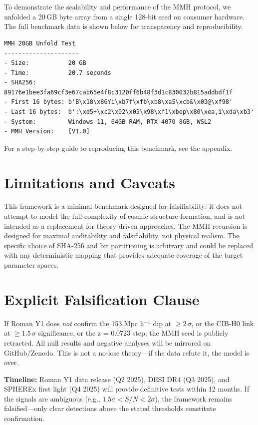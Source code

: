 \documentclass[11pt,a4paper]{article}
\begin{document}
To demonstrate the scalability and performance of the MMH protocol, we unfolded a 20\,GB byte array from a single 128-bit seed on consumer hardware. The full benchmark data is shown below for transparency and reproducibility.

\begin{verbatim}
MMH 20GB Unfold Test
---------------------
- Size:           20 GB
- Time:           20.7 seconds
- SHA256:         89176e1bee3fa69cf3e67cab65e4f8c3120ff6b48f3d1c830032b815addbdf1f
- First 16 bytes: b'B\x18\x86Yi\xb7f\xfb\xb8\xa5\xcb&\x03@\xf98'
- Last 16 bytes:  b':\xd5+\xc2\x02\x05\x98\xf1\xbep\x80\xea,i\xda\xb3'
- System:         Windows 11, 64GB RAM, RTX 4070 8GB, WSL2
- MMH Version:    [V1.0]
\end{verbatim}

For a step-by-step guide to reproducing this benchmark, see the appendix.

\FloatBarrier
\section{Limitations and Caveats}
This framework is a minimal benchmark designed for falsifiability: it does not attempt to model the full complexity of cosmic structure formation, and is not intended as a replacement for theory-driven approaches. The MMH recursion is designed for maximal auditability and falsifiability, not physical realism. The specific choice of SHA-256 and bit partitioning is arbitrary and could be replaced with any deterministic mapping that provides adequate coverage of the target parameter spaces.

\FloatBarrier
\section{Explicit Falsification Clause}
If Roman Y1 does \emph{not} confirm the 153 Mpc h$^{-1}$ dip at $\ge 2\,\sigma$, or the CIB-H0 link at $\geq 1.5\,\sigma$ significance, or the z = 0.0723 step, the MMH seed is publicly retracted. All null results and negative analyses will be mirrored on GitHub/Zenodo. This is not a no-lose theory---if the data refute it, the model is over.

\textbf{Timeline:} Roman Y1 data release (Q2 2025), DESI DR4 (Q3 2025), and SPHEREx first light (Q4 2025) will provide definitive tests within 12 months. If the signals are ambiguous (e.g., $1.5\sigma < S/N < 2\sigma$), the framework remains falsified---only clear detections above the stated thresholds constitute confirmation.
\end{document}
